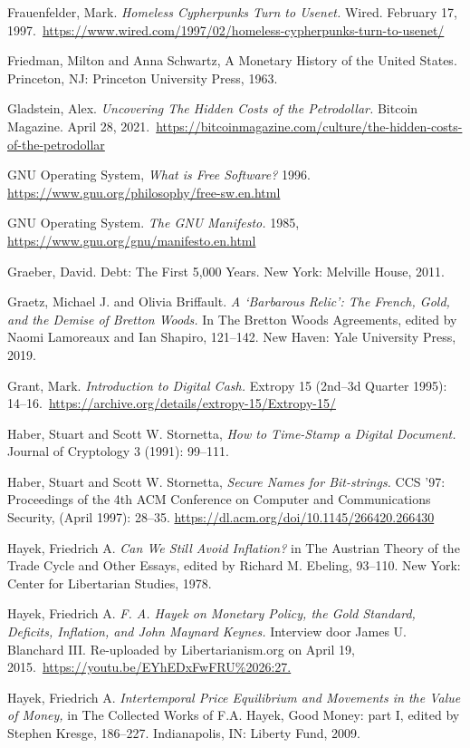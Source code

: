 \documentclass[
  a5paper,
  smalldemyvopaper,11pt,twoside,onecolumn,openright,extrafontsizes,
hidelinks]{memoir}
\begin{document}
Frauenfelder, Mark. \emph{Homeless Cypherpunks Turn to Usenet.} Wired.
February 17,
1997.~\url{https://www.wired.com/1997/02/homeless-cypherpunks-turn-to-usenet/}

Friedman, Milton and Anna Schwartz, A Monetary History of the United
States. Princeton, NJ: Princeton University Press, 1963.

Gladstein, Alex. \emph{Uncovering The Hidden Costs of the Petrodollar.}
Bitcoin Magazine. April 28,
2021.~\url{https://bitcoinmagazine.com/culture/the-hidden-costs-of-the-petrodollar}

GNU Operating System, \emph{What is Free Software?} 1996.
\url{https://www.gnu.org/philosophy/free-sw.en.html}

GNU Operating System. \emph{The GNU Manifesto.} 1985,
\url{https://www.gnu.org/gnu/manifesto.en.html}

Graeber, David. Debt: The First 5,000 Years. New York: Melville House,
2011.

Graetz, Michael J. and Olivia Briffault. \emph{A `Barbarous Relic': The
French, Gold, and the Demise of Bretton Woods.} In The Bretton Woods
Agreements, edited by Naomi Lamoreaux and Ian Shapiro, 121--142. New
Haven: Yale University Press, 2019.

Grant, Mark. \emph{Introduction to Digital Cash.} Extropy 15 (2nd--3d
Quarter 1995):
14--16.~\url{https://archive.org/details/extropy-15/Extropy-15/}

Haber, Stuart and Scott W. Stornetta, \emph{How to Time-Stamp a Digital
Document.} Journal of Cryptology 3 (1991): 99--111.

Haber, Stuart and Scott W. Stornetta, \emph{Secure Names for
Bit-strings.} CCS '97: Proceedings of the 4th ACM Conference on Computer
and Communications Security, (April 1997): 28--35.
\url{https://dl.acm.org/doi/10.1145/266420.266430}

Hayek, Friedrich A. \emph{Can We Still Avoid Inflation?} in The Austrian
Theory of the Trade Cycle and Other Essays, edited by Richard M.
Ebeling, 93--110. New York: Center for Libertarian Studies, 1978.

Hayek, Friedrich A. \emph{F. A. Hayek on Monetary Policy, the Gold
Standard, Deficits, Inflation, and John Maynard Keynes.} Interview door
James U. Blanchard III. Re-uploaded by Libertarianism.org on April 19,
2015.~\url{https://youtu.be/EYhEDxFwFRU\%2026:27.}

Hayek, Friedrich A. \emph{Intertemporal Price Equilibrium and Movements
in the Value of Money,} in The Collected Works of F.A. Hayek, Good
Money: part I, edited by Stephen Kresge, 186--227. Indianapolis, IN:
Liberty Fund, 2009.
\end{document}
